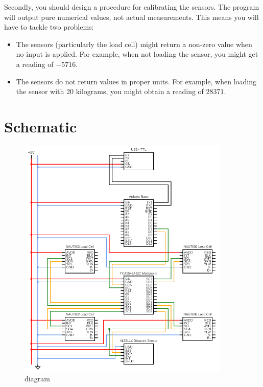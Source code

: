 \documentclass{article}
\begin{document}
 Secondly, you should design a procedure for calibrating the sensors. The program will output pure numerical values, not actual measurements. This means you will have to tackle two problems:
 \begin{itemize}
  \item The sensors (particularly the load cell) might return a non-zero value when no input is applied. For example, when not loading the sensor, you might get a reading of $-5716$.
  \item The sensors do not return values in proper units. For example, when loading the sensor with 20 kilograms, you might obtain a reading of $28371$.
 \end{itemize}

\newpage

\section{Schematic}

\begin{figure}[htbp]
 \centering
 \includegraphics[width=0.9\textwidth]{circuit.png}
 \caption{diagram}
\end{figure}
\end{document}
